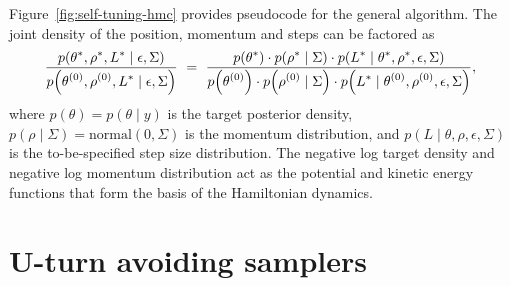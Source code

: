 \documentclass[ejs]{imsart}
\theoremstyle{plain}%
\theoremstyle{remark}
\begin{document}
Figure~\ref{fig:self-tuning-hmc} provides pseudocode for the general algorithm.  The joint density of the position, momentum and steps can be factored as
\begin{equation}
\frac{\displaystyle p\!\left(\theta^*, \rho^*,  L^* \mid \epsilon, \Sigma\right)}
         {\displaystyle p\!\left(\pos{\theta}{0}, \pos{\rho}{0}, L^* \mid \epsilon, \Sigma\right)}
\ = \ 
\frac{\displaystyle p\!\left(\theta^*\right) \cdot p\!\left(\rho^* \mid \Sigma\right) \cdot p\!\left(L^* \mid \theta^*, \rho^*, \epsilon, \Sigma\right)}
         {\displaystyle p\!\left(\pos{\theta}{0}\right) \cdot p\!\left(\pos{\rho}{0} \mid \Sigma\right) \cdot p\!\left(L^* \mid \pos{\theta}{0}, \pos{\rho}{0}, \epsilon, \Sigma\right)},
\end{equation}
where $p(\theta) = p(\theta \mid y)$ is the target posterior density, $p(\rho \mid \Sigma) = \textrm{normal}(0, \Sigma)$ is the momentum distribution, and $p(L \mid \theta, \rho, \epsilon, \Sigma)$ is the to-be-specified step size distribution.  The negative log target density and negative log momentum distribution act as the potential and kinetic energy functions that form the basis of the Hamiltonian dynamics.

\section{U-turn avoiding samplers}
\end{document}
